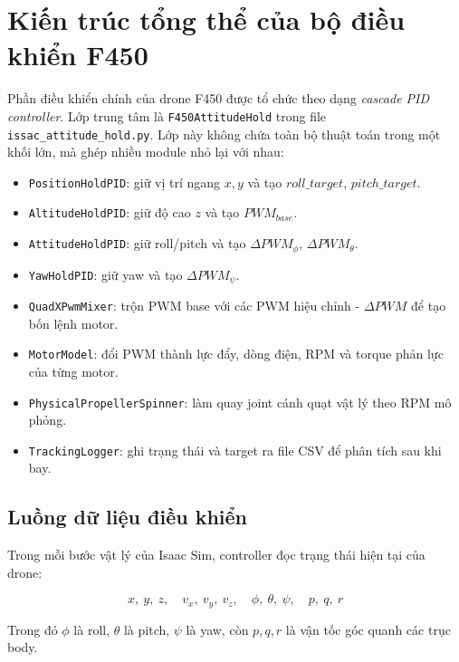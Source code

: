 \section{Kiến trúc tổng thể của bộ điều khiển F450}



Phần điều khiển chính của drone F450 được tổ chức theo dạng \textit{cascade
PID controller}. Lớp trung tâm là \texttt{F450AttitudeHold} trong file
\texttt{issac\_attitude\_hold.py}. Lớp này không chứa toàn bộ thuật toán trong
một khối lớn, mà ghép nhiều module nhỏ lại với nhau:

\begin{itemize}
    \item \texttt{PositionHoldPID}: giữ vị trí ngang $x,y$ và tạo
    $roll\_target$, $pitch\_target$.
    \item \texttt{AltitudeHoldPID}: giữ độ cao $z$ và tạo $PWM_{base}$.
    \item \texttt{AttitudeHoldPID}: giữ roll/pitch và tạo
    $\Delta PWM_\phi$, $\Delta PWM_\theta$.
    \item \texttt{YawHoldPID}: giữ yaw và tạo $\Delta PWM_\psi$.
    \item \texttt{QuadXPwmMixer}: trộn PWM base với các PWM hiệu chỉnh - $\Delta PWM$ để tạo
    bốn lệnh motor.
    \item \texttt{MotorModel}: đổi PWM thành lực đẩy, dòng điện, RPM và torque
    phản lực của từng motor.
    \item \texttt{PhysicalPropellerSpinner}: làm quay joint cánh quạt vật lý
    theo RPM mô phỏng.
    \item \texttt{TrackingLogger}: ghi trạng thái và target ra file CSV để
    phân tích sau khi bay.
\end{itemize}

\subsection{Luồng dữ liệu điều khiển}

Trong mỗi bước vật lý của Isaac Sim, controller đọc trạng thái hiện tại của
drone:

\begin{equation}
    x,\ y,\ z,\quad
    v_x,\ v_y,\ v_z,\quad
    \phi,\ \theta,\ \psi,\quad
    p,\ q,\ r
\end{equation}

Trong đó $\phi$ là roll, $\theta$ là pitch, $\psi$ là yaw, còn $p,q,r$ là vận
tốc góc quanh các trục body.

